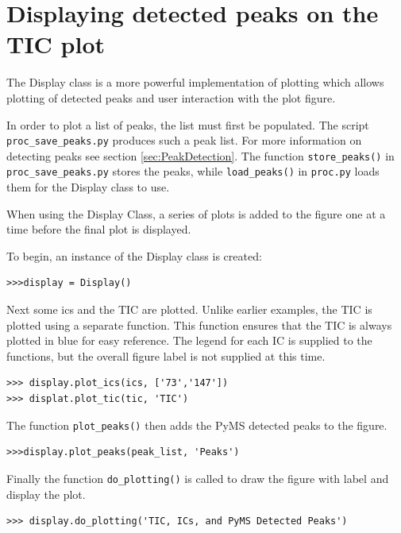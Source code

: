 \section{Displaying detected peaks on the TIC plot}


The Display class is a more powerful implementation of plotting which 
allows plotting of detected peaks and user interaction with the plot figure.



In order to plot a list of peaks, the list must first be populated.
The script {\tt proc\_save\_peaks.py} produces such a peak list. For more information
on detecting peaks see section \ref{sec:PeakDetection}. The function 
{\tt store\_peaks()} in {\tt proc\_save\_peaks.py} stores the peaks, while
{\tt load\_peaks()} in {\tt proc.py} loads them for the Display class to use.

When using the Display Class, a series of plots is added to the figure
one at a time before the final plot is displayed.

To begin, an instance of the Display class is created:

\begin{verbatim}
>>>display = Display()
\end{verbatim}

Next some ics and the TIC are plotted. Unlike earlier examples, the TIC is
plotted using a separate function. This function ensures that the TIC is always
plotted in blue for easy reference. The legend for each IC is supplied to the
functions, but the overall figure label is not supplied at this time.

\begin{verbatim}
>>> display.plot_ics(ics, ['73','147'])
>>> displat.plot_tic(tic, 'TIC')
\end{verbatim}

The function {\tt plot\_peaks()} then adds the PyMS detected peaks to the figure.

\begin{verbatim}
>>>display.plot_peaks(peak_list, 'Peaks')
\end{verbatim}

Finally the function {\tt do\_plotting()} is called to draw the figure with 
label and display the plot.

\begin{verbatim}
>>> display.do_plotting('TIC, ICs, and PyMS Detected Peaks')
\end{verbatim}

